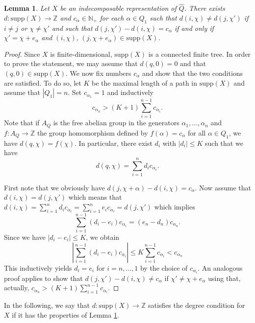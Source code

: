 \documentclass{amsart}
\newtheorem{lemma}[theorem]{Lemma}
\newcommand{\ZZ}{\mathbb{Z}}
\begin{document}
\begin{lemma}
  \label{degreecondition} 
  Let $X$ be an indecomposable representation of $\hat Q$. There exists $d:\mathrm{supp} (X)\to\ZZ$ and $c_\alpha\in\mathbb N_+$ for each $\alpha\in Q_1$ such that $d(i,\chi)\ne d(j,\chi')$ if $i\neq j$ or $\chi\neq \chi'$ and such that $d(j,\chi')-d(i,\chi)=c_\alpha$ if and only if $\chi'=\chi+e_\alpha$ and $(i,\chi),\,(j,\chi+e_\alpha)\in \mathrm{supp}(X)$. 
\end{lemma}
\begin{proof}
Since $X$ is finite-dimensional, $\mathrm{supp}( X)$ is a connected finite tree. In order to prove the statement, we may assume that $d(q,0)=0$ and that $(q,0)\in \mathrm{supp}(X)$. We now fix numbers $c_\alpha$ and show that the two conditions are satisfied. To do so, let $K$ be the maximal length of a path in $\mathrm{supp}(X)$ and assume that $|Q_1|=n$. Set $c_{\alpha_1}=1$ and inductively 
\[c_{\alpha_n}> (K+1)\sum_{i=1}^{n-1}c_{\alpha_i}.\]
Note that if $A_Q$ is the free abelian group in the generators $\alpha_1,\ldots,\alpha_n$ and $f:A_Q\to \ZZ$ the group homomorphism defined by $f(\alpha)=c_\alpha$ for all $\alpha\in Q_1$,  we have $d(q,\chi)=f(\chi)$. In particular, there exist $d_i$ with $|d_i|\leq K$ such that we have
\[d(q,\chi)=\sum_{i=1}^nd_ic_{\alpha_i}.\]

First note that we obviously have $d(j,\chi+\alpha)-d(i,\chi)=c_\alpha$. Now assume that $d(i,\chi)=d(j,\chi')$ which means that $d(i,\chi)=\sum_{i=1}^{n}d_ic_{\alpha_i}=\sum_{i=1}^{n}e_ic_{\alpha_i}=d(j,\chi')$
which implies
\[\sum_{i=1}^{n-1}(d_i-e_i)c_{\alpha_i}=(e_{n}-d_{n})c_{\alpha_{n}}.\]
Since we have $|d_i-e_i|\leq K$, we obtain $$|\sum_{i=1}^{n-1}(d_i-e_i)c_{\alpha_i}|\leq K\sum_{i=1}^{n-1}c_{\alpha_i}<c_{\alpha_n}$$
This inductively yields $d_i=e_i$ for $i=n,\ldots,1$ by the choice of $c_{\alpha_{i}}$. An analogous proof applies to show that $d(j,\chi')-d(i,\chi)\neq c_\alpha$ if $\chi'\neq \chi+e_\alpha$ using that, actually, $c_{\alpha_n}> (K+1)\sum_{i=1}^{n-1}c_{\alpha_i}$. 

\end{proof}
In the following, we say that $d:\mathrm{supp}(X)\to\ZZ$ satisfies the degree condition for $X$ if it has the properties of Lemma \ref{degreecondition}.
\end{document}
